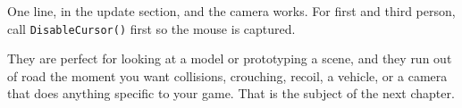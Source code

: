 One line, in the update section, and the camera works. For first and third
person, call \lstinline|DisableCursor()| first so the mouse is captured.

They are perfect for looking at a model or prototyping a scene, and they run out
of road the moment you want collisions, crouching, recoil, a vehicle, or a camera
that does anything specific to your game. That is the subject of the next
chapter.


